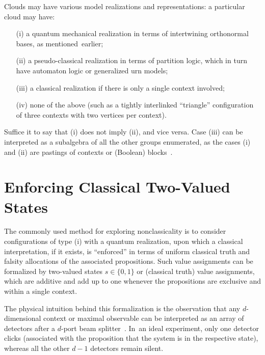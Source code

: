 Clouds may have various model realizations and representations: a particular cloud may have:
\begin{itemize}[leftmargin=21pt,labelsep=7pt]
\item[(i)] a quantum mechanical realization in terms of intertwining orthonormal bases, as mentioned~earlier;
\item[(ii)] a pseudo-classical realization in terms of partition logic, which in turn have automaton logic or generalized urn models;
\item[(iii)] a classical realization if there is only a single context involved;
\item[(iv)] none of the above (such as a tightly interlinked ``triangle'' configuration of three contexts with two vertices per context).
\end{itemize}

Suffice it to say that (i) does not imply (ii), and vice versa.
Case (iii) can be interpreted as
a subalgebra of all the other groups enumerated, as the cases (i) and (ii) are pastings of contexts or (Boolean) blocks~\cite{nav:91}.

\section{Enforcing Classical Two-Valued States}

The commonly used method for exploring nonclassicality is to consider
configurations of type (i) with a quantum realization, upon which a classical interpretation, if it exists,
is ``enforced'' in terms of uniform classical truth and falsity allocations of the associated propositions.
Such value assignments
can be formalized by two-valued states $s \in \{0,1\}$ or (classical truth) value assignments,
which are additive and add up to one whenever the propositions are exclusive and within a single context.

The physical intuition behind this formalization is the observation that any $d$-dimensional context or maximal observable
can be interpreted as an array of detectors after a $d$-port beam splitter~\cite{rzbb}.
In~an ideal experiment, only one detector clicks (associated with the proposition that the system is in the respective state),
whereas all the other $d-1$ detectors remain silent.


